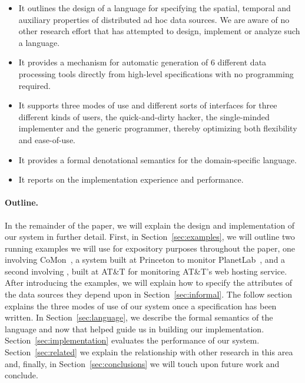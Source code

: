 \begin{itemize}
\item It outlines the design of a language for specifying the 
spatial, temporal and auxiliary properties of distributed ad hoc data
sources.  We are aware of no other research effort that has attempted
to design, implement or analyze such a language.

\item It provides a mechanism for automatic generation of 6 different
data processing tools directly from high-level specifications with no
programming required.

\item It supports three modes of use and different sorts of interfaces
for three different kinds of users, 
the quick-and-dirty hacker, the single-minded implementer and the generic 
programmer, thereby optimizing both flexibility and ease-of-use.

\item It provides a formal denotational semantics for the domain-specific
language.

\item It reports on the implementation experience and performance.
\end{itemize}

\paragraph{Outline.}
In the remainder of the paper, we will explain the design and
implementation of our system in further detail.  First, 
in Section~\ref{sec:examples}, we will
outline two running examples we will use for expository purposes
throughout the paper, one involving CoMon~\cite{comon}, a system built at Princeton
to monitor PlanetLab~\cite{planetlab}, 
and a second involving \ningaui{}, built at
AT\&T for monitoring AT\&T's web hosting service.  After introducing
the examples, we will explain how to specify the attributes of the
data sources they depend upon in Section~\ref{sec:informal}. 
The follow section explains the three modes of use of our system
once a specification has been written.  In Section~\ref{sec:language},
we describe the formal semantics of the language and now that helped guide
us in building our implementation.  Section~\ref{sec:implementation}
evaluates the performance of our system.
Section~\ref{sec:related} we explain the relationship with other
research in this area and, finally, in Section~\ref{sec:conclusions} we
will touch upon future work and conclude.

